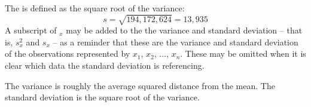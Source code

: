 The  is defined as the square root of the variance:
$$s=\sqrt{194,172,624} = 13,935$$
A subscript of $_x$ may be added to the the variance and standard deviation -- that is, $s_x^2$ and $s_x^{}$ -- as a reminder that these are the variance and standard deviation of the observations represented by $x_1^{}$, $x_2^{}$, ..., $x_n^{}$. These may be omitted when it is clear which data the standard deviation is referencing.

\begin{termBox}{
The variance is roughly the average squared distance from the mean. The standard deviation is the square root of the variance.}
\end{termBox}

